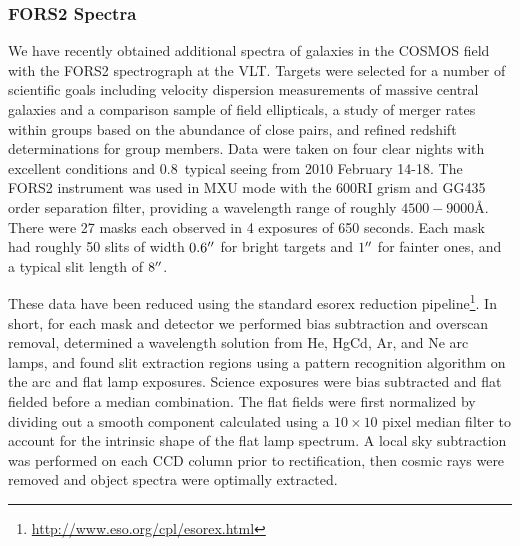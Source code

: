 \subsubsection{FORS2 Spectra}
\label{cat_s:fors2}
We have recently obtained additional spectra of galaxies in the COSMOS
field with the FORS2 spectrograph at the VLT. Targets were selected
for a number of scientific goals including velocity dispersion
measurements of massive central galaxies and a comparison sample of field ellipticals, a
study of merger rates within groups based on the abundance of close
pairs, and refined redshift determinations for 
group members. Data were taken on four clear nights with excellent
conditions and 0.8\arcsec\ typical seeing from 2010 February 14-18. The
FORS2 instrument was used in MXU mode with the 600RI grism and GG435
order separation filter, providing a wavelength range of roughly
$4500-9000$\AA. There were 27 masks each observed in 4 exposures of
650 seconds. Each mask had roughly 50 slits of width $0.6\mbox{$^{\prime\prime}$}$ for
bright targets and $1\mbox{$^{\prime\prime}$}$ for fainter ones, and a typical slit
length of $8\mbox{$^{\prime\prime}$}$.

These data have been reduced using the standard {\sc esorex} reduction
pipeline\footnote{\url{http://www.eso.org/cpl/esorex.html}}. In short, for
each mask and detector we performed bias subtraction and overscan
removal, determined a wavelength solution from He, HgCd, Ar, and Ne arc
lamps, and found slit extraction regions using a pattern recognition
algorithm on the arc and flat lamp exposures. Science exposures were
bias subtracted and flat fielded before a median combination. The flat
fields were first normalized by dividing out a smooth component
calculated using a $10\times10$ pixel median filter to account for the
intrinsic shape of the flat lamp spectrum. A local sky subtraction was
performed on each CCD column prior to rectification, then cosmic rays
were removed and object spectra were optimally extracted. 

